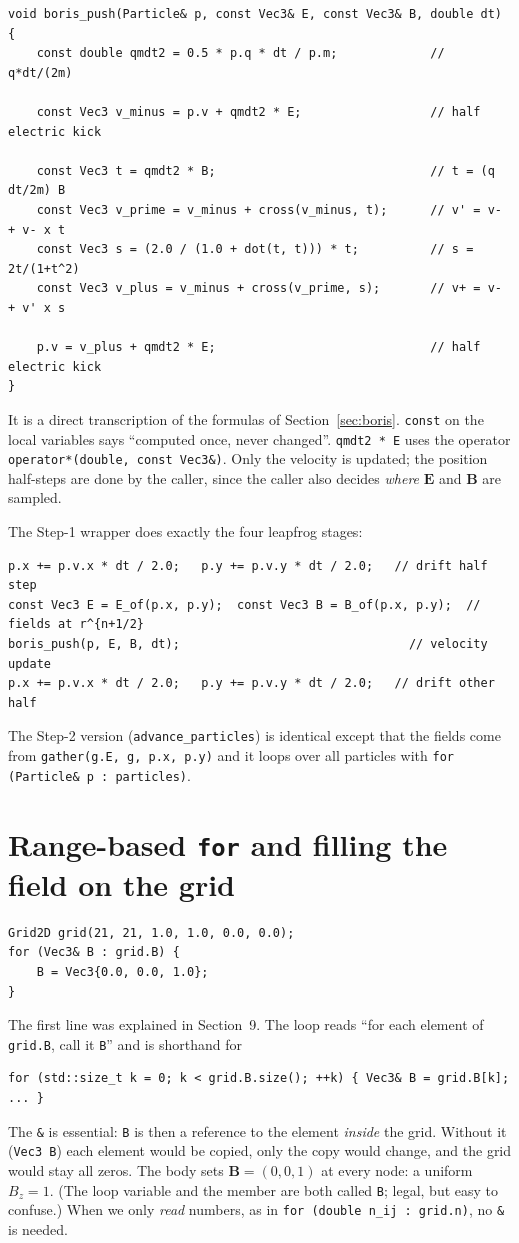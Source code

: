 \documentclass[11pt,a4paper]{article}
\newcommand{\EE}{\mathbf{E}}
\newcommand{\BB}{\mathbf{B}}
\begin{document}
\begin{lstlisting}
void boris_push(Particle& p, const Vec3& E, const Vec3& B, double dt) {
    const double qmdt2 = 0.5 * p.q * dt / p.m;             // q*dt/(2m)

    const Vec3 v_minus = p.v + qmdt2 * E;                  // half electric kick

    const Vec3 t = qmdt2 * B;                              // t = (q dt/2m) B
    const Vec3 v_prime = v_minus + cross(v_minus, t);      // v' = v- + v- x t
    const Vec3 s = (2.0 / (1.0 + dot(t, t))) * t;          // s = 2t/(1+t^2)
    const Vec3 v_plus = v_minus + cross(v_prime, s);       // v+ = v- + v' x s

    p.v = v_plus + qmdt2 * E;                              // half electric kick
}
\end{lstlisting}
It is a direct transcription of the formulas of Section~\ref{sec:boris}. \texttt{const} on the local
variables says ``computed once, never changed''. \texttt{qmdt2 * E} uses the operator
\lstinline|operator*(double, const Vec3&)|. Only the velocity is updated; the position half-steps are done
by the caller, since the caller also decides \emph{where} $\EE$ and $\BB$ are sampled.

The Step-1 wrapper does exactly the four leapfrog stages:
\begin{lstlisting}
p.x += p.v.x * dt / 2.0;   p.y += p.v.y * dt / 2.0;   // drift half step
const Vec3 E = E_of(p.x, p.y);  const Vec3 B = B_of(p.x, p.y);  // fields at r^{n+1/2}
boris_push(p, E, B, dt);                                // velocity update
p.x += p.v.x * dt / 2.0;   p.y += p.v.y * dt / 2.0;   // drift other half
\end{lstlisting}
The Step-2 version (\texttt{advance\_particles}) is identical except that the fields come from
\lstinline|gather(g.E, g, p.x, p.y)| and it loops over all particles with \lstinline|for (Particle& p : particles)|.

\section{Range-based \texttt{for} and filling the field on the grid}

\begin{lstlisting}
Grid2D grid(21, 21, 1.0, 1.0, 0.0, 0.0);
for (Vec3& B : grid.B) {
    B = Vec3{0.0, 0.0, 1.0};
}
\end{lstlisting}
The first line was explained in Section~9. The loop reads ``for each element of \texttt{grid.B}, call it
\texttt{B}'' and is shorthand for
\begin{lstlisting}
for (std::size_t k = 0; k < grid.B.size(); ++k) { Vec3& B = grid.B[k]; ... }
\end{lstlisting}
The \texttt{\&} is essential: \texttt{B} is then a reference to the element \emph{inside} the grid. Without it
(\lstinline|Vec3 B|) each element would be copied, only the copy would change, and the grid would stay all zeros.
The body sets $\BB=(0,0,1)$ at every node: a uniform $B_z=1$. (The loop variable and the member are both called
\texttt{B}; legal, but easy to confuse.) When we only \emph{read} numbers, as in
\lstinline|for (double n_ij : grid.n)|, no \texttt{\&} is needed.
\end{document}
